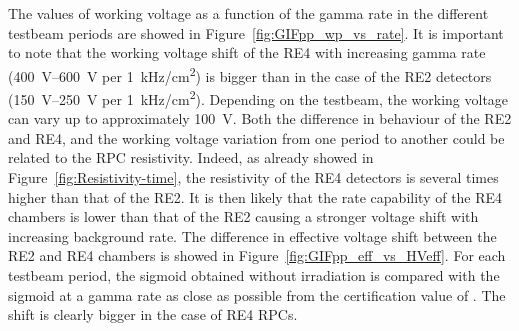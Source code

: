 	The values of working voltage as a function of the gamma rate in the different testbeam periods are showed in Figure~\ref{fig:GIFpp_wp_vs_rate}. It is important to note that the working voltage shift of the RE4 with increasing gamma rate (\SIrange{400}{600}{V} per \SI{1}{kHz/cm^2}) is bigger than in the case of the RE2 detectors (\SIrange{150}{250}{V} per \SI{1}{kHz/cm^2}). Depending on the testbeam, the working voltage can vary up to approximately \SI{100}{V}. Both the difference in behaviour of the RE2 and RE4, and the working voltage variation from one period to another could be related to the RPC resistivity. Indeed, as already showed in Figure~\ref{fig:Resistivity-time}, the resistivity of the RE4 detectors is several times higher than that of the RE2. It is then likely that the rate capability of the RE4 chambers is lower than that of the RE2 causing a stronger voltage shift with increasing background rate. The difference in effective voltage shift between the RE2 and RE4 chambers is showed in Figure~\ref{fig:GIFpp_eff_vs_HVeff}. For each testbeam period, the sigmoid obtained without irradiation is compared with the sigmoid at a gamma rate as close as possible from the certification value of . The shift is clearly bigger in the case of RE4 RPCs.\\
	
